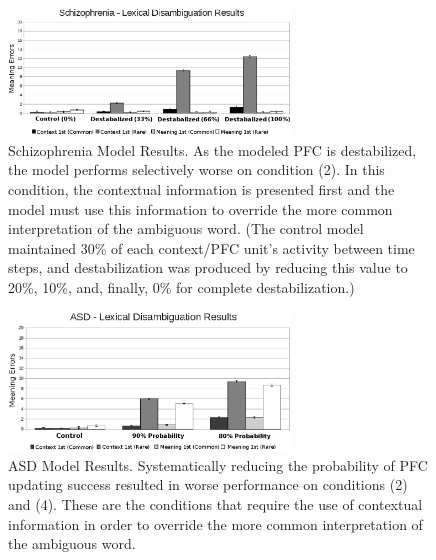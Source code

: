 \begin{figure}[tp]
\begin{center}
	\includegraphics[width=75mm]{graphs/schiz_lexamb_results.eps}
\end{center}
\caption{Schizophrenia Model Results. As the modeled PFC is destabilized, the model performs selectively worse on condition (2).  In this condition, the contextual information is presented first and the model must use this information to override the more common interpretation of the ambiguous word. (The control model maintained 30\% of each context/PFC unit's activity between time steps, and destabilization was produced by reducing this value to 20\%, 10\%, and, finally, 0\% for complete destabilization.)} 
\label{Schiz-Amb-Results}
\end{figure} 

\begin{figure}[tp]
\begin{center}
	\includegraphics[width=75mm]{graphs/asd_lexamb_results.eps}
\end{center}
\caption{ASD Model Results. Systematically reducing the probability of PFC updating success resulted in worse performance on conditions (2) and (4). These are the conditions that require the use of contextual information in order to override the more common interpretation of the ambiguous word.} 
\label{ASD-Amb-Results}
\end{figure} 

